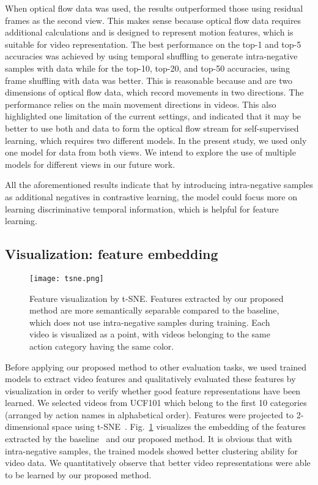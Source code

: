 \documentclass[sigconf]{acmart}
\begin{document}
When optical flow data was used, the results outperformed those using residual frames as the second view. This makes sense because optical flow data requires additional calculations and is designed to represent motion features, which is suitable for video representation. The best performance on the top-1 and top-5 accuracies was achieved by using temporal shuffling to generate intra-negative samples with  data while for the top-10, top-20, and top-50 accuracies, using frame shuffling with  data was better. This is reasonable because  and  are two dimensions of optical flow data, which record movements in two directions. The performance relies on the main movement directions in videos. This also highlighted one limitation of the current settings, and indicated that it may be better to use both  and  data to form the optical flow stream for self-supervised learning, which requires two different models. In the present study, we used only one model for data from both views. We intend to explore the use of multiple models for different views in our future work.

All the aforementioned results indicate that by introducing intra-negative samples as additional negatives in contrastive learning, the model could focus more on learning discriminative temporal information, which is helpful for feature learning.

\subsection{Visualization: feature embedding}
\begin{figure}[t]
  \centering
  \texttt{[image: tsne.png]}
  \caption{Feature visualization by t-SNE. Features extracted by our proposed method are more semantically separable compared to the baseline, which does not use intra-negative samples during training. Each video is visualized as a point, with videos belonging to the same action category having the same color.}
  \label{tsne}
\end{figure} 

Before applying our proposed method to other evaluation tasks, we used trained models to extract video features and qualitatively evaluated these features by visualization in order to verify whether good feature representations have been learned. We selected videos from UCF101 which belong to the first 10 categories (arranged by action names in alphabetical order). Features were projected to 2-dimensional space using t-SNE~\cite{maaten2008visualizing}. Fig.~\ref{tsne} visualizes the embedding of the features extracted by the baseline~\cite{tian2019contrastive} and our proposed method. It is obvious that with intra-negative samples, the trained models showed better clustering ability for video data. We quantitatively observe that better video representations were able to be learned by our proposed method.
\end{document}

